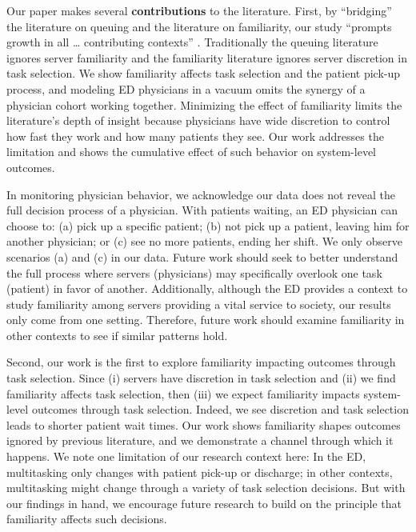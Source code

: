  Our paper makes several \textbf{contributions} to the literature. First, by “bridging” the literature on queuing and the literature on familiarity, our study “prompts growth in all … contributing contexts” \citep[p. 732]{Reisman1995}. Traditionally the queuing literature ignores server familiarity and the familiarity literature ignores server discretion in task selection. We show familiarity affects task selection and the patient pick-up process, and modeling ED physicians in a vacuum omits the synergy of a physician cohort working together. Minimizing the effect of familiarity limits the literature's depth of insight because physicians have wide discretion to control how fast they work and how many patients they see. Our work addresses the limitation and shows the cumulative effect of such behavior on system-level outcomes.
 
 In monitoring physician behavior, we acknowledge our data does not reveal the full decision process of a physician. With patients waiting, an ED physician can choose to: (a) pick up a specific patient; (b) not pick up a patient, leaving him for another physician; or (c) see no more patients, ending her shift. We only observe scenarios (a) and (c) in our data. Future work should seek to better understand the full process where servers (physicians) may specifically overlook one task (patient) in favor of another. Additionally, although the ED provides a context to study familiarity among servers providing a vital service to society, our results only come from one setting. Therefore, future work should examine familiarity in other contexts to see if similar patterns hold.
 
 Second, our work is the first to explore familiarity impacting outcomes through task selection. Since (i) servers have discretion in task selection and (ii) we find familiarity affects task selection, then (iii) we expect familiarity impacts system-level outcomes through task selection. Indeed, we see discretion and task selection leads to shorter patient wait times. Our work shows familiarity shapes outcomes ignored by previous literature, and we demonstrate a channel through which it happens. We note one limitation of our research context here: In the ED, multitasking only changes with patient pick-up or discharge; in other contexts, multitasking might change through a variety of task selection decisions. But with our findings in hand, we encourage future research to build on the principle that familiarity affects such decisions.
 
